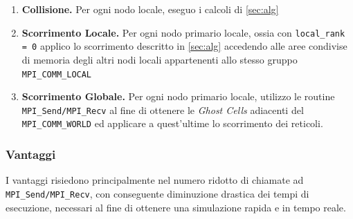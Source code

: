 \documentclass[12pt]{article}
\begin{document}
\begin{enumerate}
    \item \textbf{Collisione.} Per ogni nodo locale, eseguo i calcoli di \ref{sec:alg}
    \item \textbf{Scorrimento Locale.} Per ogni nodo primario locale, ossia con \verb|local_rank = 0| applico lo scorrimento descritto in \ref{sec:alg} accedendo alle aree condivise di memoria degli altri nodi locali appartenenti allo stesso gruppo \verb|MPI_COMM_LOCAL|
    \item \textbf{Scorrimento Globale.} Per ogni nodo primario locale, utilizzo le routine \verb|MPI_Send/MPI_Recv| al fine di ottenere le \textit{Ghost Cells} adiacenti del \verb|MPI_COMM_WORLD| ed applicare a quest'ultime lo scorrimento dei reticoli.
\end{enumerate}

\subsubsection{Vantaggi}
I vantaggi risiedono principalmente nel numero ridotto di chiamate ad \verb|MPI_Send/MPI_Recv|, con conseguente diminuzione drastica dei tempi di esecuzione, necessari al fine di ottenere una simulazione rapida e in tempo reale.
\end{document}
